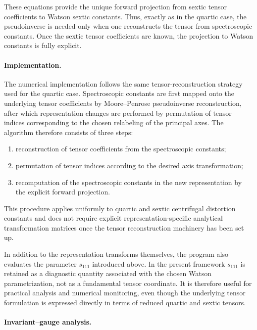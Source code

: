 These equations provide the unique forward projection from sextic tensor
coefficients to Watson sextic constants.  Thus, exactly as in the quartic case,
the pseudoinverse is needed only when one reconstructs the tensor from
spectroscopic constants.  Once the sextic tensor coefficients are known, the
projection to Watson constants is fully explicit.

\paragraph{Implementation.}

The numerical implementation follows the same tensor-reconstruction strategy
used for the quartic case.  Spectroscopic constants are first mapped onto the
underlying tensor coefficients by Moore--Penrose pseudoinverse reconstruction,
after which representation changes are performed by permutation of tensor
indices corresponding to the chosen relabeling of the principal axes.  The
algorithm therefore consists of three steps:
\begin{enumerate}
\item reconstruction of tensor coefficients from the spectroscopic constants;
\item permutation of tensor indices according to the desired axis
transformation;
\item recomputation of the spectroscopic constants in the new representation by
the explicit forward projection.
\end{enumerate}

This procedure applies uniformly to quartic and sextic centrifugal distortion
constants and does not require explicit representation-specific analytical
transformation matrices once the tensor reconstruction machinery has been set
up.

In addition to the representation transforms themselves, the program also
evaluates the parameter $s_{111}$ introduced above.  In the present framework
$s_{111}$ is retained as a diagnostic quantity associated with the chosen
Watson parametrization, not as a fundamental tensor coordinate.  It is therefore
useful for practical analysis and numerical monitoring, even though the
underlying tensor formulation is expressed directly in terms of reduced quartic
and sextic tensors.

\paragraph{Invariant--gauge analysis.}

